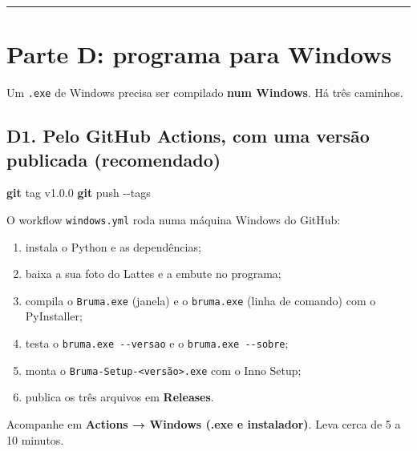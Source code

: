 \documentclass[
  10pt,
]{article}
\newenvironment{Shaded}{\begin{snugshade}}{\end{snugshade}}
\newcommand{\AttributeTok}[1]{\textcolor[rgb]{0.13,0.29,0.53}{#1}}
\newcommand{\FunctionTok}[1]{\textcolor[rgb]{0.13,0.29,0.53}{\textbf{#1}}}
\newcommand{\NormalTok}[1]{#1}
\providecommand{\tightlist}{%
  \setlength{\itemsep}{0pt}\setlength{\parskip}{0pt}}
\begin{document}
\begin{center}\rule{0.5\linewidth}{0.5pt}\end{center}

\hypertarget{parte-d-programa-para-windows}{%
\section{Parte D: programa para
Windows}\label{parte-d-programa-para-windows}}

Um \texttt{.\allowbreak{}exe} de Windows precisa ser compilado
\textbf{num Windows}. Há três caminhos.

\hypertarget{d1.-pelo-github-actions-com-uma-versuxe3o-publicada-recomendado}{%
\subsection{D1. Pelo GitHub Actions, com uma versão publicada
(recomendado)}\label{d1.-pelo-github-actions-com-uma-versuxe3o-publicada-recomendado}}

\begin{Shaded}
\begin{Highlighting}[]
\FunctionTok{git}\NormalTok{ tag v1.0.0}
\FunctionTok{git}\NormalTok{ push }\AttributeTok{{-}{-}tags}
\end{Highlighting}
\end{Shaded}

O workflow \texttt{windows.\allowbreak{}yml} roda numa máquina Windows
do GitHub:

\begin{enumerate}
\def\labelenumi{\arabic{enumi}.}
\tightlist
\item
  instala o Python e as dependências;
\item
  baixa a sua foto do Lattes e a embute no programa;
\item
  compila o \texttt{Bruma.\allowbreak{}exe} (janela) e o
  \texttt{bruma.\allowbreak{}exe} (linha de comando) com o PyInstaller;
\item
  testa o
  \texttt{bruma.\allowbreak{}exe -\allowbreak{}-\allowbreak{}versao} e o
  \texttt{bruma.\allowbreak{}exe -\allowbreak{}-\allowbreak{}sobre};
\item
  monta o
  \texttt{Bruma-\allowbreak{}Setup-\allowbreak{}<versão>.\allowbreak{}exe}
  com o Inno Setup;
\item
  publica os três arquivos em \textbf{Releases}.
\end{enumerate}

Acompanhe em \textbf{Actions → Windows (.exe e instalador)}. Leva cerca
de 5 a 10 minutos.
\end{document}
